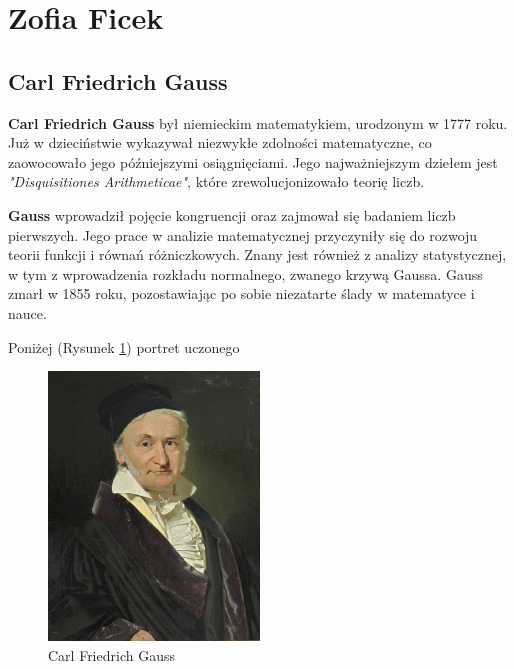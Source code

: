 \section{Zofia Ficek}

\subsection{Carl Friedrich Gauss}

\hspace{\parindent} \textbf{Carl Friedrich Gauss} był niemieckim matematykiem, urodzonym w 1777 roku. Już w dzieciństwie wykazywał niezwykłe zdolności matematyczne, co zaowocowało jego późniejszymi osiągnięciami. Jego najważniejszym dziełem jest \textit{"Disquisitiones Arithmeticae"}, które zrewolucjonizowało teorię liczb. 
\par \textbf{Gauss} wprowadził pojęcie kongruencji oraz zajmował się badaniem liczb pierwszych. Jego prace w analizie matematycznej przyczyniły się do rozwoju teorii funkcji i równań różniczkowych. Znany jest również z analizy statystycznej, w tym z wprowadzenia rozkładu normalnego, zwanego krzywą Gaussa. Gauss zmarł w 1855 roku, pozostawiając po sobie niezatarte ślady w matematyce i nauce.
\par\noindent Poniżej (Rysunek \ref{fig:gauss}) portret uczonego
\begin{figure}[ht]
    \centering
    \includegraphics[width=0.5\textwidth]{pictures/gauss.jpg}
    \caption{Carl Friedrich Gauss}
    \label{fig:gauss}
\end{figure}

